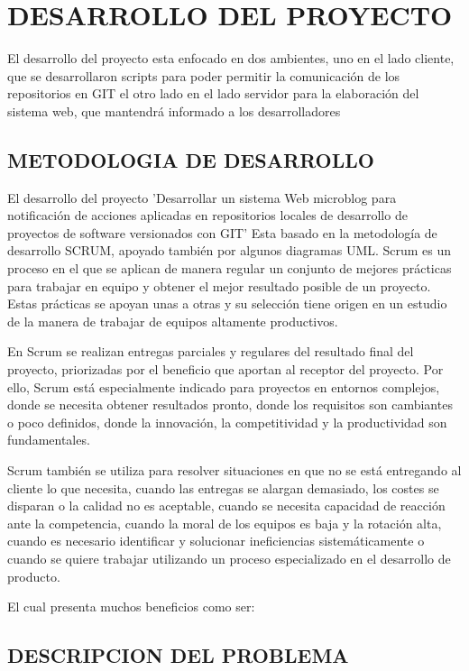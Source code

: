 

%
\chapter{DESARROLLO DEL PROYECTO}
El desarrollo del proyecto esta enfocado en dos ambientes, uno en el lado cliente, que se desarrollaron scripts para poder permitir la comunicación de los repositorios en GIT
el otro lado en el lado servidor para la elaboración del sistema web, que mantendrá informado a los desarrolladores
\section{METODOLOGIA DE DESARROLLO}
El desarrollo del proyecto 'Desarrollar un sistema Web microblog para notificación de acciones aplicadas en repositorios locales de desarrollo de proyectos de software versionados con GIT' Esta basado en la metodología de desarrollo SCRUM, apoyado también por algunos diagramas UML.
Scrum es un proceso en el que se aplican de manera regular un conjunto de mejores prácticas para trabajar en equipo y obtener el mejor resultado posible de un proyecto. Estas prácticas se apoyan unas a otras y su selección tiene origen en un estudio de la manera de trabajar de equipos altamente productivos.

En Scrum se realizan entregas parciales y regulares del resultado final del proyecto, priorizadas por el beneficio que aportan al receptor del proyecto. Por ello, Scrum está especialmente indicado para proyectos en entornos complejos, donde se necesita obtener resultados pronto, donde los requisitos son cambiantes o poco definidos, donde la innovación, la competitividad y la productividad son fundamentales.

Scrum también se utiliza para resolver situaciones en que no se está entregando al cliente lo que necesita, cuando las entregas se alargan demasiado, los costes se disparan o la calidad no es aceptable, cuando se necesita capacidad de reacción ante la competencia, cuando la moral de los equipos es baja y la rotación alta, cuando es necesario identificar y solucionar ineficiencias sistemáticamente o cuando se quiere trabajar utilizando un proceso especializado en el desarrollo de producto.

El cual presenta muchos beneficios como ser:
\section{DESCRIPCION DEL PROBLEMA}

%
